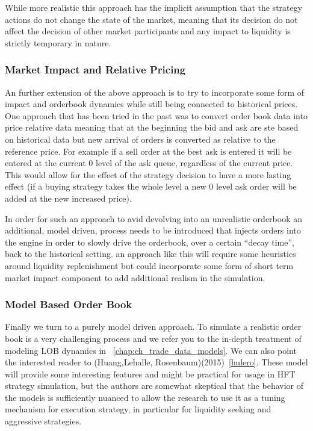While more realistic this approach has the implicit assumption that the strategy actions do not change the state of the market, meaning that its decision do not affect the decision of other market participants and any impact to liquidity is strictly temporary in nature. 



\subsubsection{Market Impact and Relative Pricing}

An further extension of the above approach is to try to incorporate some form of impact and orderbook dynamics while still being connected to historical prices. One approach that has been tried in the past was to convert order book data into price relative data meaning that at the beginning the bid and ask are ste based on historical data but new arrival of orders is converted as relative to the reference price. For example if a sell order at the best ask is entered it will be entered at the current 0 level of the ask queue, regardless of the current price. This would allow for the effect of the strategy decision to have a more lasting effect (if a buying strategy takes the whole level a new 0 level ask order will be added at the new increased price). 


In order for such an approach to avid devolving into an unrealistic orderbook an additional, model driven, process needs to be introduced that injects orders into the engine in order to slowly drive the orderbook, over a certain ``decay time'', back to the historical setting. an approach like this will require some heuristics around liquidity replenishment but could incorporate some form of short term market impact component to add additional realism in the simulation.


\subsubsection{Model Based Order Book}

Finally we turn to a purely model driven approach. To simulate a realistic order book is a very challenging process and we refer you to the in-depth treatment of modeling LOB dynamics in ~\ref{chap:ch_trade_data_models}. We can also point the interested reader to (Huang,Lehalle, Rosenbaum)(2015)~\ref{hulero}. These model will provide some interesting features and might be practical for usage in HFT strategy simulation, but the authors are somewhat skeptical that the behavior of the models is sufficiently nuanced to allow the research to use it as a tuning mechanism for execution strategy, in particular for liquidity seeking and aggressive strategies.


